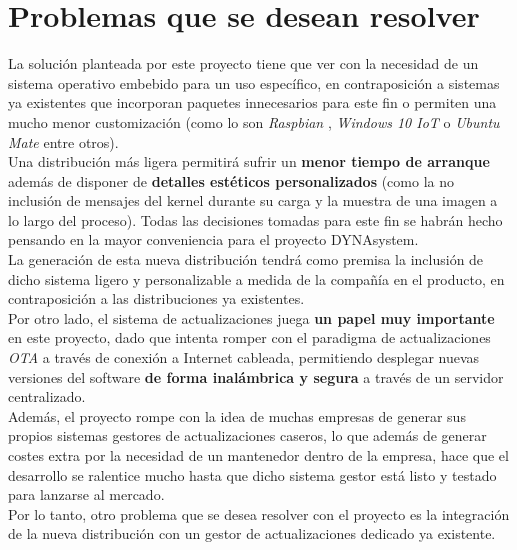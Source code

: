 \section{Problemas que se desean resolver}

La solución planteada por este proyecto tiene que ver con la necesidad de un sistema operativo embebido para un uso específico, en contraposición a sistemas ya existentes que incorporan paquetes innecesarios para este fin o permiten una mucho menor customización (como lo son \textit{Raspbian} \cite{raspbian}, \textit{Windows 10 IoT} \cite{windows-10-iot} o \textit{Ubuntu Mate} \cite{ubuntu-mate-raspberry} entre otros).\\

Una distribución más ligera permitirá sufrir un \textbf{menor tiempo de arranque} además de disponer de \textbf{detalles estéticos personalizados} (como la no inclusión de mensajes del kernel durante su carga y la muestra de una imagen a lo largo del proceso). Todas las decisiones tomadas para este fin se habrán hecho pensando en la mayor conveniencia para el proyecto DYNAsystem.\\

La generación de esta nueva distribución tendrá como premisa la inclusión de dicho sistema ligero y personalizable a medida de la compañía en el producto, en contraposición a las distribuciones ya existentes.\\

Por otro lado, el sistema de actualizaciones juega \textbf{un papel muy importante} en este proyecto, dado que intenta romper con el paradigma de actualizaciones \textit{OTA} a través de conexión a Internet cableada, permitiendo desplegar nuevas versiones del software \textbf{de forma inalámbrica y segura} a través de un servidor centralizado.\\

Además, el proyecto rompe con la idea de muchas empresas de generar sus propios sistemas gestores de actualizaciones caseros, lo que además de generar costes extra por la necesidad de un mantenedor dentro de la empresa, hace que el desarrollo se ralentice mucho hasta que dicho sistema gestor está listo y testado para lanzarse al mercado.\\

Por lo tanto, otro problema que se desea resolver con el proyecto es la integración de la nueva distribución con un gestor de actualizaciones dedicado ya existente.

\newpage
